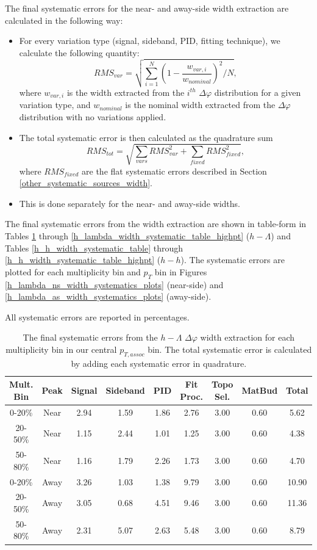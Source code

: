 \documentclass[ALICE,manyauthors]{ALICE_analysis_notes}
\begin{document}
The final systematic errors for the near- and away-side width extraction are calculated in the following way:
\begin{itemize}
\item For every variation type (signal, sideband, PID, fitting technique), we calculate the following quantity:
	\begin{equation}
		RMS_{var} = \sqrt{\sum_{i=1}^{N} (1 - \frac{w_{var, i}}{w_{nominal}})^2 / N},
	\end{equation}
	where $w_{var, i}$ is the width extracted from the $i^{th}$ $\Delta\varphi$ distribution for a given variation type, and $w_{nominal}$ is the nominal width extracted from the $\Delta\varphi$ distribution with no variations applied.
\item The total systematic error is then calculated as the quadrature sum
\begin{equation} 
	RMS_{tot} = \sqrt{\sum_{vars} RMS_{var}^2 + \sum_{fixed}RMS_{fixed}^2},
\end{equation}
where $RMS_{fixed}$ are the flat systematic errors described in Section \ref{other_systematic_sources_width}.
\item This is done separately for the near- and away-side widths.
\end{itemize}

The final systematic errors from the width extraction are shown in table-form in Tables \ref{h_lambda_width_systematic_table} through \ref{h_lambda_width_systematic_table_highpt} ($h-\Lambda$) and Tables \ref{h_h_width_systematic_table} through \ref{h_h_width_systematic_table_highpt} ($h-h$). The systematic errors are plotted for each multiplicity bin and $p_{T}$ bin in Figures \ref{h_lambda_ns_width_systematics_plots} (near-side) and \ref{h_lambda_as_width_systematics_plots} (away-side).

All systematic errors are reported in percentages. 

\begin{table}[ht]
\centering
\begin{tabular}{|c|c||c|c|c|c|c|c||c|}
\hline
Mult. Bin & Peak & Signal & Sideband & PID & Fit Proc. & Topo Sel. & MatBud & Total \\
\hline
0-20\% & Near & 2.94 & 1.59 & 1.86 & 2.76 & 3.00 & 0.60 & 5.62 \\
20-50\% & Near & 1.15 & 2.44 & 1.01 & 1.25 & 3.00 & 0.60 & 4.38 \\
50-80\% & Near & 1.16 & 1.79 & 2.26 & 1.73 & 3.00 & 0.60 & 4.70 \\
0-20\% & Away & 3.26 & 1.03 & 1.38 & 9.79 & 3.00 & 0.60 & 10.90 \\
20-50\% & Away & 3.05 & 0.68 & 4.51 & 9.46 & 3.00 & 0.60 & 11.36 \\
50-80\% & Away & 2.31 & 5.07 & 2.63 & 5.48 & 3.00 & 0.60 & 8.79 \\
\hline
\end{tabular}
\caption{The final systematic errors from the $h-\Lambda$ $\Delta\varphi$ width extraction  for each multiplicity bin in our central $p_{T, assoc}$ bin. The total systematic error is calculated by adding each systematic error in quadrature.}
\label{h_lambda_width_systematic_table}
\end{table}
\end{document}
